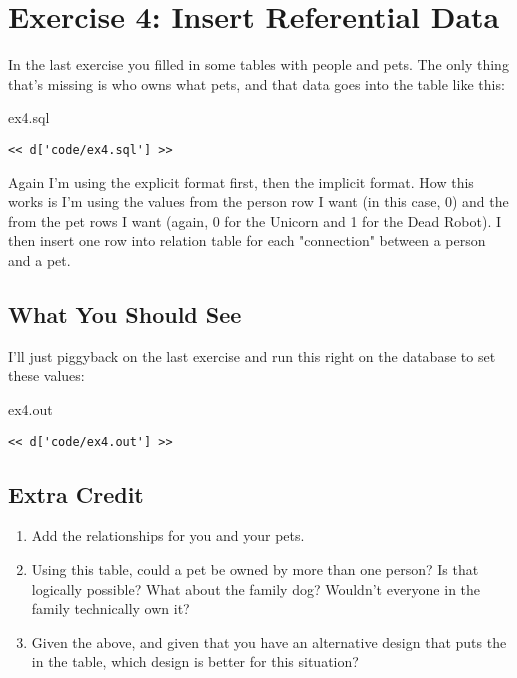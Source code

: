 \chapter{Exercise 4: Insert Referential Data}

In the last exercise you filled in some tables with people and pets.
The only thing that's missing is who owns what pets, and that data 
goes into the  table like this:

\begin{code}{ex4.sql}
\begin{Verbatim}
<< d['code/ex4.sql'] >>
\end{Verbatim}
\end{code}

Again I'm using the explicit format first, then the implicit format.
How this works is I'm using the  values from the person
row I want (in this case, 0) and the  from the pet rows
I want (again, 0 for the Unicorn and 1 for the Dead Robot).  I then
insert one row into  relation table for each 
"connection" between a person and a pet.

\section{What You Should See}

I'll just piggyback on the last exercise and run this right on the
 database to set these values:

\begin{code}{ex4.out}
\begin{Verbatim}
<< d['code/ex4.out'] >>
\end{Verbatim}
\end{code}


\section{Extra Credit}

\begin{enumerate}
\item Add the relationships for you and your pets.
\item Using this table, could a pet be owned by more than one person?  Is that logically possible?  What about the family dog? Wouldn't everyone in the family technically own it?
\item Given the above, and given that you have an alternative design that puts the  in the  table, which design is better for this situation?
\end{enumerate}


